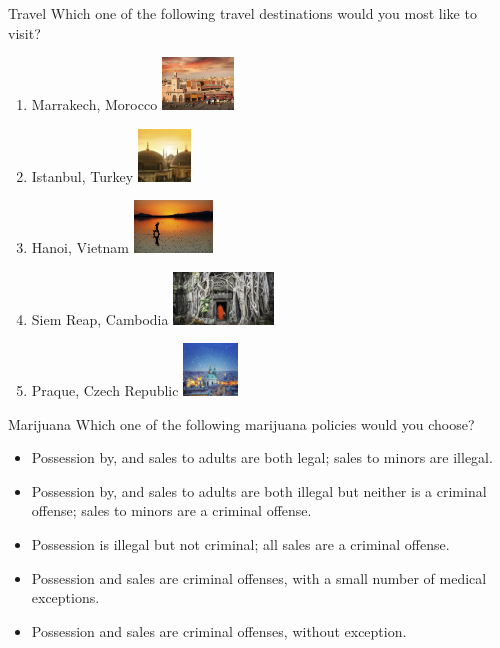 \documentclass{beamer}
\begin{document}
\begin{frame}{Travel}
Which one of the following travel destinations would you most like to visit?

\begin{enumerate}
\item Marrakech, Morocco
\includegraphics[height=1.4cm]{Travel1.jpg}

\item Istanbul, Turkey
\includegraphics[height=1.4cm]{Travel2.jpg}

\item Hanoi, Vietnam
\includegraphics[height=1.4cm]{Travel3.jpg}

\item Siem Reap, Cambodia
\includegraphics[height=1.4cm]{Travel4.jpg}

\item Praque, Czech Republic
\includegraphics[height=1.4cm]{Travel5.jpg}
\end{enumerate}	
\end{frame}

\begin{frame}{Marijuana}
Which one of the following marijuana policies would you choose?

\begin{itemize}
	\item Possession by, and sales to adults are both legal; sales to minors are illegal.
	\item Possession by, and sales to adults are both illegal but neither is a criminal offense; sales to minors are a criminal offense.
	\item Possession is illegal but not criminal; all sales are a criminal offense.
	\item Possession and sales are criminal offenses, with a small number of medical exceptions.
	\item Possession and sales are criminal offenses, without exception.
\end{itemize}
\end{frame}
\end{document}
